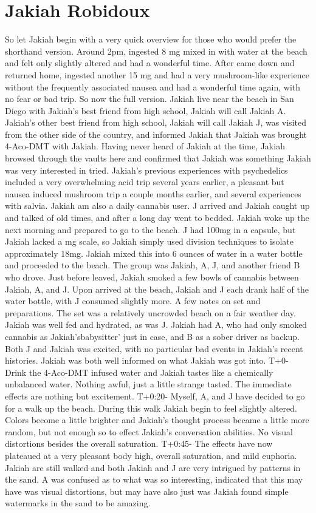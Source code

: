 \documentclass[12pt]{book}
\begin{document}
\chapter{Jakiah Robidoux}

So let Jakiah begin with a very quick overview for those who would prefer the shorthand version. Around 2pm, ingested 8 mg mixed in with water at the beach and felt only slightly altered and had a wonderful time. After came down and returned home, ingested another 15 mg and had a very mushroom-like experience without the frequently associated nausea and had a wonderful time again, with no fear or bad trip. So now the full version. Jakiah live near the beach in San Diego with Jakiah's best friend from high school, Jakiah will call Jakiah A. Jakiah's other best friend from high school, Jakiah will call Jakiah J, was visited from the other side of the country, and informed Jakiah that Jakiah was brought 4-Aco-DMT with Jakiah. Having never heard of Jakiah at the time, Jakiah browsed through the vaults here and confirmed that Jakiah was something Jakiah was very interested in tried. Jakiah's previous experiences with psychedelics included a very overwhelming acid trip several years earlier, a pleasant but nausea induced mushroom trip a couple months earlier, and several experiences with salvia. Jakiah am also a daily cannabis user. J arrived and Jakiah caught up and talked of old times, and after a long day went to bedded. Jakiah woke up the next morning and prepared to go to the beach. J had 100mg in a capsule, but Jakiah lacked a mg scale, so Jakiah simply used division techniques to isolate approximately 18mg. Jakiah mixed this into 6 ounces of water in a water bottle and proceeded to the beach. The group was Jakiah, A, J, and another friend B who drove. Just before leaved, Jakiah smoked a few bowls of cannabis between Jakiah, A, and J. Upon arrived at the beach, Jakiah and J each drank half of the water bottle, with J consumed slightly more. A few notes on set and preparations. The set was a relatively uncrowded beach on a fair weather day. Jakiah was well fed and hydrated, as was J. Jakiah had A, who had only smoked cannabis as Jakiah'sbabysitter' just in case, and B as a sober driver as backup. Both J and Jakiah was excited, with no particular bad events in Jakiah's recent histories. Jakiah was both well informed on what Jakiah was got into. T+0- Drink the 4-Aco-DMT infused water and Jakiah tastes like a chemically unbalanced water. Nothing awful, just a little strange tasted. The immediate effects are nothing but excitement. T+0:20- Myself, A, and J have decided to go for a walk up the beach. During this walk Jakiah begin to feel slightly altered. Colors become a little brighter and Jakiah's thought process became a little more random, but not enough so to effect Jakiah's conversation abilities. No visual distortions besides the overall saturation. T+0:45- The effects have now plateaued at a very pleasant body high, overall saturation, and mild euphoria. Jakiah are still walked and both Jakiah and J are very intrigued by patterns in the sand. A was confused as to what was so interesting, indicated that this may have was visual distortions, but may have also just was Jakiah found simple watermarks in the sand to be amazing. 
\end{document}
